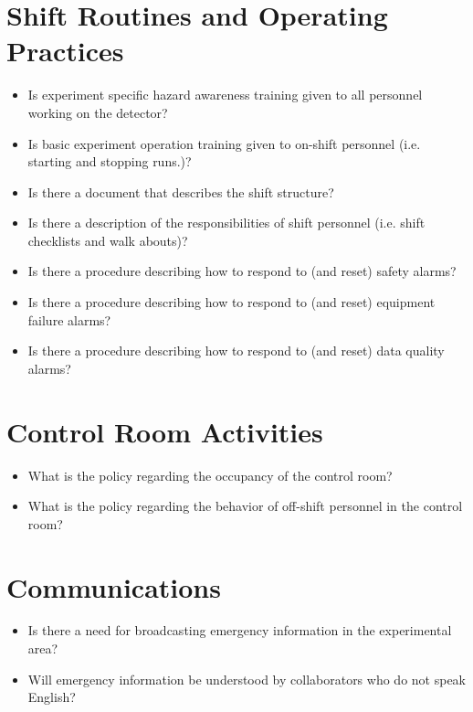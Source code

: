 \section{Shift Routines and Operating Practices}

\begin{itemize}
\item   Is experiment specific hazard awareness training given to all personnel working on 
the detector?

\item   Is basic experiment operation training given to on-shift personnel (i.e. starting and 
stopping runs.)?

\item   Is there a document that describes the shift structure?

\item   Is there a description of the responsibilities of shift personnel (i.e. shift checklists 
and walk abouts)?

\item   Is there a procedure describing how to respond to (and reset) safety alarms?

\item   Is there a procedure describing how to respond to (and reset) equipment failure 
alarms?

\item   Is there a procedure describing how to respond to (and reset) data quality alarms?

\end{itemize}

\section{Control Room Activities}


\begin{itemize}
\item   What is the policy regarding the occupancy of the control room?

\item   What is the policy regarding the behavior of off-shift personnel in the control 
room?

\end{itemize}

\section{Communications}


\begin{itemize}
\item   Is there a need for broadcasting emergency information in the experimental area?

\item   Will emergency information be understood by collaborators who do not speak 
English?


\end{itemize}

